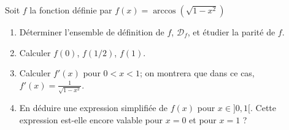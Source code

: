 
\begin{exercice}\label{exosession2-0001}

Soit $f$ la fonction définie par $f(x)=\arccos(\sqrt{1-x^2})$
\begin{enumerate}
\item Déterminer l’ensemble  de définition de $f$, $\mathcal{D}_f$, et étudier la parité de $f$.
\item Calculer $f(0)$, $f(1/2)$, $f(1)$.
\item Calculer $f'(x)$ pour $0<x<1$; on montrera que dans ce cas, $\displaystyle f'(x)= \frac{1}{\sqrt{1-x^2}}$.
\item En déduire une expression simplifiée de $f(x)$ pour $x\in]0,1[$. Cette expression est-elle encore valable pour $x=0$ et pour $x=1$ ?
\end{enumerate}

\end{exercice}
